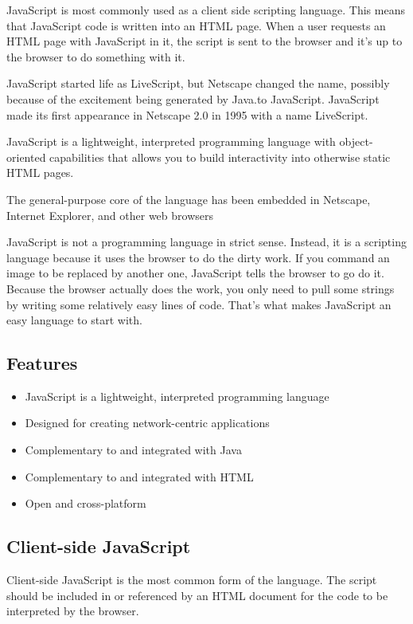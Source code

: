 \documentclass[11pt,a4paper]{article}
\author{TalentSprint}
\date{}
\begin{document}
JavaScript is most commonly used as a client side scripting language. This means that JavaScript code is written into an HTML page. When a user requests an HTML page with JavaScript in it, the script is sent to the browser and it's up to the browser to do something with it.

JavaScript started life as LiveScript, but Netscape changed the name, possibly because of the excitement being generated by Java.to JavaScript. JavaScript made its first appearance in Netscape 2.0 in 1995 with a name LiveScript.

JavaScript is a lightweight, interpreted programming language with object-oriented capabilities that allows you to build interactivity into otherwise static HTML pages.

The general-purpose core of the language has been embedded in Netscape, Internet Explorer, and other web browsers

JavaScript is not a programming language in strict sense. Instead, it is a scripting language because it uses the browser to do the dirty work. If you command an image to be replaced by another one, JavaScript tells the browser to go do it. Because the browser actually does the work, you only need to pull some strings by writing some relatively easy lines of code. That’s what makes JavaScript an easy language to start with.\\

\subsection*{Features}
\begin{itemize}
\item JavaScript is a lightweight, interpreted programming language
\item Designed for creating network-centric applications
\item Complementary to and integrated with Java
\item Complementary to and integrated with HTML
\item Open and cross-platform
\end{itemize}

\subsection*{Client-side JavaScript}
Client-side JavaScript is the most common form of the language. The script should be included in or referenced by an HTML document for the code to be interpreted by the browser.
\end{document}
